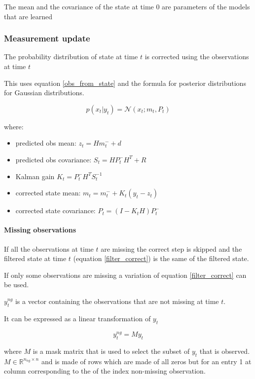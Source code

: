 \documentclass{article}
\let\Oldsubsubsection\subsubsection
\renewcommand{\subsubsection}{\FloatBarrier\Oldsubsubsection}
\begin{document}
The mean and the covariance of the state at time $0$ are parameters of the models that are learned

\subsubsection{Measurement update}

The probability distribution of state at time $t$ is corrected using the observations at time $t$

This uses equation \ref{obs_from_state} and the formula for posterior distributions for Gaussian distributions.

\begin{equation}\label{filter_update}
 p(x_t|y_t) = \mathcal{N}(x_t; m_t, P_t)   
\end{equation}
    
where:

\begin{itemize}
    \item predicted obs mean: $z_t = Hm_t^- + d$   
    \item predicted obs covariance: $S_t = HP_t^-H^T + R$
    \item Kalman gain $K_t = P_t^-H^TS_t^{-1}$ 
    \item corrected state mean: $m_t = m_t^- + K_t(y_t - z_t)$ 
    \item corrected state covariance: $P_t = (I-K_tH)P_t^-$ 
\end{itemize}

\paragraph{Missing observations}
If all the observations at time $t$ are missing the correct step is skipped and the filtered state at time $t$ (equation \ref{filter_correct}) is the same of the filtered state.

If only some observations are missing a variation of equation \ref{filter_correct} can be used.

$y^{ng}_t$ is a vector containing the observations that are not missing at time $t$. 

It can be expressed as a linear transformation of $y_t$

$$ y^{ng}_t = My_t$$

where $M$ is a mask matrix that is used to select the subset of $y_t$ that is observed. $M \in \mathbb{R}^{n_{ng} \times n}$ and is made of rows which are made of all zeros but for an entry 1 at column corresponding to the of the index non-missing observation.
\end{document}
